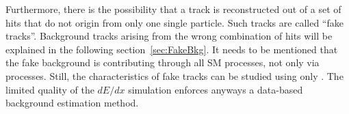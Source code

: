Furthermore, there is the possibility that a track is reconstructed out of a set of hits that do not origin from only one single particle.
Such tracks are called ``fake tracks''. 
Background tracks arising from the wrong combination of hits will be explained in the following section~\ref{sec:FakeBkg}.
It needs to be mentioned that the fake background is contributing through all SM processes, not only via \WJets processes.
Still, the characteristics of fake tracks can be studied using only \WJets.
The limited quality of the $dE/dx$ simulation enforces anyways a data-based background estimation method.



